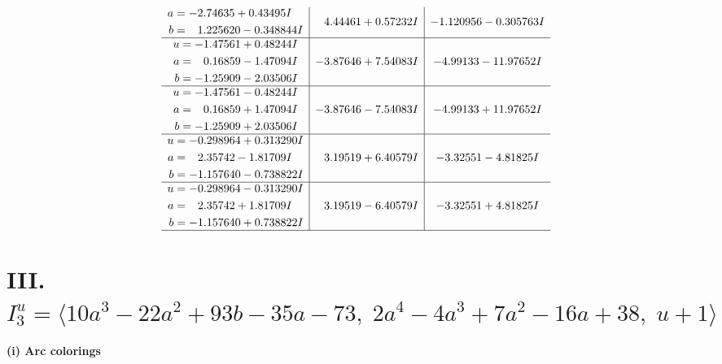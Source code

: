 \documentclass[1p]{elsarticle_modified}
\theoremstyle{definition}
\begin{document}
$$\begin{array}{c|c|c}
\begin{aligned}
a &= -2.74635 + 0.43495 I \\
b &= \phantom{-}1.225620 - 0.348844 I\end{aligned}
 & \phantom{-}4.44461 + 0.57232 I & -1.120956 - 0.305763 I \\ \hline\begin{aligned}
u &= -1.47561 + 0.48244 I \\
a &= \phantom{-}0.16859 - 1.47094 I \\
b &= -1.25909 - 2.03506 I\end{aligned}
 & -3.87646 + 7.54083 I & -4.99133 - 11.97652 I \\ \hline\begin{aligned}
u &= -1.47561 - 0.48244 I \\
a &= \phantom{-}0.16859 + 1.47094 I \\
b &= -1.25909 + 2.03506 I\end{aligned}
 & -3.87646 - 7.54083 I & -4.99133 + 11.97652 I \\ \hline\begin{aligned}
u &= -0.298964 + 0.313290 I \\
a &= \phantom{-}2.35742 - 1.81709 I \\
b &= -1.157640 - 0.738822 I\end{aligned}
 & \phantom{-}3.19519 + 6.40579 I & -3.32551 - 4.81825 I \\ \hline\begin{aligned}
u &= -0.298964 - 0.313290 I \\
a &= \phantom{-}2.35742 + 1.81709 I \\
b &= -1.157640 + 0.738822 I\end{aligned}
 & \phantom{-}3.19519 - 6.40579 I & -3.32551 + 4.81825 I\\
 \hline 
 \end{array}$$\newpage\newpage\renewcommand{\arraystretch}{1}
\centering \section*{III. $I^u_{3}= \langle 10 a^3-22 a^2+93 b-35 a-73,\;2 a^4-4 a^3+7 a^2-16 a+38,\;u+1 \rangle$}
\flushleft \textbf{(i) Arc colorings}\\
\end{document}

